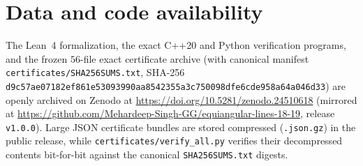 \documentclass[11pt,reqno]{amsart}
\theoremstyle{definition}
\theoremstyle{remark}
\begin{document}
\section*{Data and code availability}
The Lean~4 formalization, the exact C++20 and Python verification programs, and the frozen $56$-file exact certificate archive (with canonical manifest \nolinkurl{certificates/SHA256SUMS.txt}, SHA-256 \nolinkurl{d9c57ae07182ef861e53093990aa8542355a3c750098dfe6cde958a64a046d33}) are openly archived on Zenodo at \url{https://doi.org/10.5281/zenodo.24510618} (mirrored at \url{https://github.com/Mehardeep-Singh-GG/equiangular-lines-18-19}, release \texttt{v1.0.0}). Large JSON certificate bundles are stored compressed (\texttt{.json.gz}) in the public release, while \nolinkurl{certificates/verify_all.py} verifies their decompressed contents bit-for-bit against the canonical \nolinkurl{SHA256SUMS.txt} digests.



\end{document}
